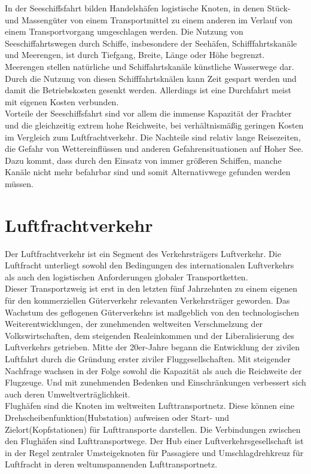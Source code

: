 \documentclass[a4paper,12pt]{scrreprt}
\begin{document}
	In der Seeschiffsfahrt bilden Handelshäfen logistische Knoten, in denen Stück- und Massengüter von einem Transportmittel zu einem anderen im Verlauf von einem Transportvorgang umgeschlagen werden. Die Nutzung von Seeschiffahrtswegen durch Schiffe, insbesondere der Seehäfen, Schifffahrtskanäle und Meerengen, ist durch Tiefgang, Breite, Länge oder Höhe begrenzt. Meerengen stellen natürliche und Schiffahrtskanäle künstliche Wasserwege dar. Durch die Nutzung von diesen Schifffahrtsknälen kann Zeit gespart werden und damit die Betriebskosten gesenkt werden. Allerdings ist eine Durchfahrt meist mit eigenen Kosten verbunden.\\
	
	Vorteile der Seeschiffsfahrt sind vor allem die immense Kapazität der Frachter und die gleichzeitig extrem hohe Reichweite, bei verhältnismäßig geringen Kosten im Vergleich zum Luftfrachtverkehr. Die Nachteile sind relativ lange Reisezeiten, die Gefahr von Wettereinflüssen  und anderen Gefahrensituationen auf Hoher See. Dazu kommt, dass durch den Einsatz von immer größeren Schiffen, manche Kanäle nicht mehr befahrbar sind und somit Alternativwege gefunden werden müssen. 
	
	\section{Luftfrachtverkehr}
	Der Luftfrachtverkehr ist ein Segment des Verkehrsträgers Luftverkehr. Die Luftfracht unterliegt sowohl den Bedingungen des internationalen Luftverkehrs als auch den logistischen Anforderungen globaler Transportketten. \\
	
	Dieser Transportzweig ist erst in den letzten fünf Jahrzehnten zu einem eigenen für den kommerziellen Güterverkehr relevanten Verkehrsträger geworden. Das Wachstum des geflogenen Güterverkehrs ist maßgeblich von den technologischen Weiterentwicklungen, der zunehmenden weltweiten Verschmelzung der Volkswirtschaften, dem steigenden Realeinkommen und der Liberalisierung des Luftverkehrs getrieben. Mitte der 20er-Jahre begann die Entwicklung der zivilen Luftfahrt durch die Gründung erster ziviler Fluggesellschaften. Mit steigender Nachfrage wachsen in der Folge sowohl die Kapazität als auch die Reichweite der Flugzeuge. Und mit zunehmenden Bedenken und Einschränkungen verbessert sich auch deren Umweltverträglichkeit.\\
	
	Flughäfen sind die Knoten im weltweiten Lufttransportnetz. Diese können eine Drehscheibenfunktion(Hubstation) aufweisen oder Start- und Zielort(Kopfstationen) für Lufttransporte darstellen. Die Verbindungen zwischen den Flughäfen sind Lufttransportwege. Der Hub einer Luftverkehrsgesellschaft ist in der Regel zentraler Umsteigeknoten für Passagiere und Umschlagdrehkreuz für Luftfracht in deren weltumspannenden Lufttransportnetz. \\
	
\end{document}
